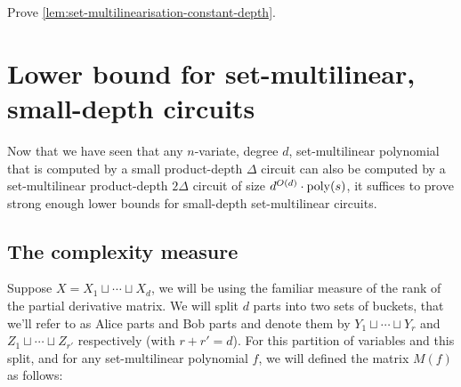 \begin{exercise}
Prove \autoref{lem:set-multilinearisation-constant-depth}. 
\end{exercise}

\section{Lower bound for set-multilinear, small-depth circuits}

Now that we have seen that any $n$-variate, degree $d$, set-multilinear polynomial that is computed by a small product-depth $\Delta$ circuit can also be computed by a set-multilinear product-depth $2\Delta$ circuit of size $d^{O(d)} \cdot \operatorname{poly}(s)$, it suffices to prove strong enough lower bounds for small-depth set-multilinear circuits.

\subsection{The complexity measure}

Suppose $X = X_1 \sqcup \cdots \sqcup X_d$, we will be using the familiar measure of the rank of the partial derivative matrix. We will split $d$ parts into two sets of buckets, that we'll refer to as Alice parts and Bob parts and denote them by $Y_1 \sqcup \cdots \sqcup Y_r$ and $Z_1 \sqcup \cdots \sqcup Z_{r'}$ respectively (with $r + r' = d$). For this partition of variables and this split, and for any set-multilinear polynomial $f$, we will defined the matrix $M(f)$ as follows:


